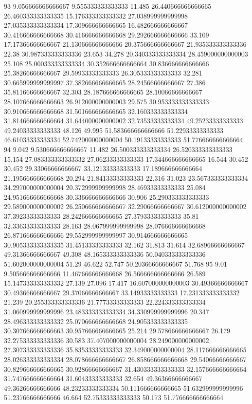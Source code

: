 93 9.056666666666667 9.555333333333333 11.485 26.440666666666665 26.460333333333335 15.176333333333332 27.038999999999998 27.035333333333334 17.309666666666665 16.482666666666667 30.416666666666668 30.416666666666668 29.292666666666666 33.109 17.17366666666667 21.130666666666666 20.375666666666667 21.935333333333336 22.38 30.987333333333336 23.653 34.278 20.340333333333334 28.459000000000003 25.108 25.000333333333334 30.352666666666664 30.836666666666666 25.38266666666667 29.59933333333333 26.305333333333333 32.281 30.665999999999997 37.382666666666665 28.24566666666667 27.386 35.81166666666667 32.303 28.187666666666665 28.10066666666667 28.107666666666663 26.912000000000003 29.575 30.953333333333333 30.910666666666668 31.501666666666665 32.160333333333334 31.814666666666664 31.644000000000002 32.73533333333334 49.25233333333333 49.24033333333333 48.126 49.995 51.583666666666666 51.22933333333333 46.61033333333334 52.742000000000004 50.19133333333333 51.776666666666664
94 9.042 9.530666666666667 11.482 26.500333333333334 26.520333333333333 15.154 27.083333333333332 27.06233333333333 17.344666666666665 16.544 30.452 30.452 29.33066666666667 33.12133333333333 17.189666666666664 21.195666666666668 20.294 21.84133333333333 22.316 31.023 23.567333333333334 34.297000000000004 20.372999999999998 28.46933333333333 25.084 24.951666666666668 30.336666666666666 30.906 25.290333333333333 29.589000000000002 26.250666666666667 32.29066666666667 30.612000000000002 37.39233333333333 28.242666666666665 27.37933333333333 35.81 32.33633333333333 28.163 28.067999999999998 28.076666666666668 26.871666666666666 29.552999999999997 30.914666666666665 30.905333333333335 31.45133333333333 32.162 31.813 31.614 32.68966666666667 49.31366666666667 49.308 48.165333333333336 50.040333333333336 51.602000000000004 51.29 46.622 52.747 50.20366666666667 51.768
95 9.01 9.505666666666666 11.467666666666668 26.566666666666666 26.589 15.147333333333332 27.139 27.096 17.417 16.607000000000003 30.49366666666667 30.49366666666667 29.37066666666667 33.14933333333333 17.231333333333332 21.239 20.255333333333336 21.77733333333333 22.224333333333334 31.060999999999996 23.483333333333334 34.330999999999996 20.347 28.496333333333332 25.070666666666668 24.905333333333335 30.307666666666663 30.957666666666665 25.214 29.578666666666667 26.179 32.275333333333336 30.583 37.407000000000004 28.249000000000002 27.307333333333336 35.83533333333333 32.349000000000004 28.117666666666665 28.026333333333334 28.078666666666667 26.858666666666668 29.54066666666667 30.829666666666665 30.92866666666667 31.430333333333333 32.157666666666664 31.747666666666664 31.60433333333333 32.654 49.36366666666667 49.36266666666666 48.23233333333334 50.111666666666665 51.632999999999996 51.23766666666666 46.664 52.75333333333333 50.173 51.776666666666664
